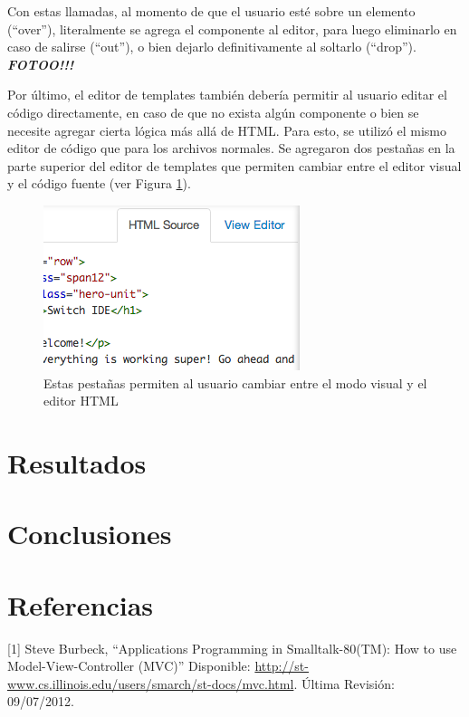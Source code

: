 \documentclass[12pt,titlepage,]{article}
\makeatletter
\def\maxwidth{\ifdim\Gin@nat@width>\linewidth\linewidth
\else\Gin@nat@width\fi}
\let\Oldincludegraphics\includegraphics
\renewcommand{\includegraphics}[1]{\Oldincludegraphics[width=\maxwidth]{#1}}
\makeatother
\begin{document}
Con estas llamadas, al momento de que el usuario esté sobre un elemento
(``over''), literalmente se agrega el componente al editor, para luego
eliminarlo en caso de salirse (``out''), o bien dejarlo definitivamente
al soltarlo (``drop''). \textbf{\emph{FOTOO!!!}}

Por último, el editor de templates también debería permitir al usuario
editar el código directamente, en caso de que no exista algún componente
o bien se necesite agregar cierta lógica más allá de HTML. Para esto, se
utilizó el mismo editor de código que para los archivos normales. Se
agregaron dos pestañas en la parte superior del editor de templates que
permiten cambiar entre el editor visual y el código fuente (ver Figura
\ref{figure:html-editor}).

\begin{figure}[htbp]
\centering
\includegraphics{figures/html-editor.png}
\caption{Estas pestañas permiten al usuario cambiar entre el modo visual
y el editor HTML \label{figure:html-editor}}
\end{figure}

\newpage

\section{Resultados}

\newpage

\section{Conclusiones}

\newpage

\section{Referencias}

{[}1{]} Steve Burbeck, ``Applications Programming in Smalltalk-80(TM):
How to use Model-View-Controller (MVC)'' Disponible:
\href{http://st-www.cs.illinois.edu/users/smarch/st-docs/mvc.html}{http://st-www.cs.illinois.edu/users/smarch/st-docs/mvc.html}.
Última Revisión: 09/07/2012.
\end{document}
